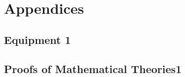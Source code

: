 \appendix
\chapter*{Appendices}
\renewcommand{\thesection}{\Alph{section}} %
 
\thispagestyle{plain}

\section{Equipment 1}
\label{appendix:equipment}

\section{Proofs of Mathematical Theories1}
\label{appendix:math}